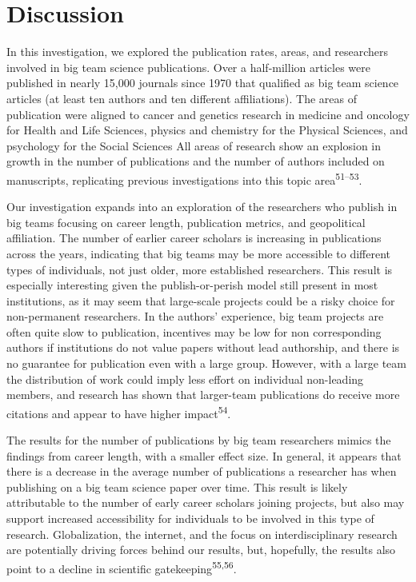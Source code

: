 \documentclass[
  man,floatsintext]{apa6}
\begin{document}
\hypertarget{discussion}{%
\section{Discussion}\label{discussion}}

In this investigation, we explored the publication rates, areas, and
researchers involved in big team science publications. Over a
half-million articles were published in nearly 15,000 journals since
1970 that qualified as big team science articles (at least ten authors
and ten different affiliations). The areas of publication were aligned
to cancer and genetics research in medicine and oncology for Health and
Life Sciences, physics and chemistry for the Physical Sciences, and
psychology for the Social Sciences All areas of research show an
explosion in growth in the number of publications and the number of
authors included on manuscripts, replicating previous investigations
into this topic area\textsuperscript{51--53}.

Our investigation expands into an exploration of the researchers who
publish in big teams focusing on career length, publication metrics, and
geopolitical affiliation. The number of earlier career scholars is
increasing in publications across the years, indicating that big teams
may be more accessible to different types of individuals, not just
older, more established researchers. This result is especially
interesting given the publish-or-perish model still present in most
institutions, as it may seem that large-scale projects could be a risky
choice for non-permanent researchers. In the authors' experience, big
team projects are often quite slow to publication, incentives may be low
for non corresponding authors if institutions do not value papers
without lead authorship, and there is no guarantee for publication even
with a large group. However, with a large team the distribution of work
could imply less effort on individual non-leading members, and research
has shown that larger-team publications do receive more citations and
appear to have higher impact\textsuperscript{54}.

The results for the number of publications by big team researchers
mimics the findings from career length, with a smaller effect size. In
general, it appears that there is a decrease in the average number of
publications a researcher has when publishing on a big team science
paper over time. This result is likely attributable to the number of
early career scholars joining projects, but also may support increased
accessibility for individuals to be involved in this type of research.
Globalization, the internet, and the focus on interdisciplinary research
are potentially driving forces behind our results, but, hopefully, the
results also point to a decline in scientific gatekeeping\textsuperscript{55,56}.
\end{document}
